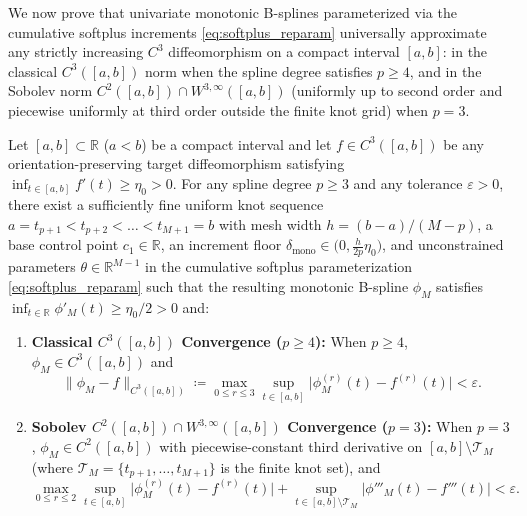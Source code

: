 We now prove that univariate monotonic B-splines parameterized via the cumulative softplus increments \eqref{eq:softplus_reparam} universally approximate any strictly increasing $C^3$ diffeomorphism on a compact interval $[a, b]$: in the classical $C^3([a, b])$ norm when the spline degree satisfies $p \ge 4$, and in the Sobolev norm $C^2([a, b]) \cap W^{3,\infty}([a, b])$ (uniformly up to second order and piecewise uniformly at third order outside the finite knot grid) when $p = 3$.

\begin{theorem}
\label{thm:univariate_c3_universality}
Let $[a, b] \subset \mathbb{R}$ ($a < b$) be a compact interval and let $f \in C^3([a, b])$ be any orientation-preserving target diffeomorphism satisfying $\inf_{t \in [a, b]} f'(t) \ge \eta_0 > 0$. For any spline degree $p \ge 3$ and any tolerance $\varepsilon > 0$, there exist a sufficiently fine uniform knot sequence $a = t_{p+1} < t_{p+2} < \dots < t_{M+1} = b$ with mesh width $h = (b - a)/(M - p)$, a base control point $c_1 \in \mathbb{R}$, an increment floor $\delta_{\text{mono}} \in \big(0, \frac{h}{2p}\eta_0\big)$, and unconstrained parameters $\theta \in \mathbb{R}^{M-1}$ in the cumulative softplus parameterization \eqref{eq:softplus_reparam} such that the resulting monotonic B-spline $\phi_M$ satisfies $\inf_{t \in \mathbb{R}} \phi'_M(t) \ge \eta_0 / 2 > 0$ and:
\begin{enumerate}
    \item \textbf{Classical $C^3([a, b])$ Convergence ($p \ge 4$):} When $p \ge 4$, $\phi_M \in C^3([a, b])$ and
    \begin{equation}
        \| \phi_M - f \|_{C^3([a, b])} \coloneqq \max_{0 \le r \le 3} \sup_{t \in [a, b]} \big| \phi_M^{(r)}(t) - f^{(r)}(t) \big| < \varepsilon.
        \label{eq:c3_norm_bound}
    \end{equation}
    \item \textbf{Sobolev $C^2([a, b]) \cap W^{3,\infty}([a, b])$ Convergence ($p = 3$):} When $p = 3$, $\phi_M \in C^2([a, b])$ with piecewise-constant third derivative on $[a, b] \setminus \mathcal{T}_M$ (where $\mathcal{T}_M = \{t_{p+1}, \dots, t_{M+1}\}$ is the finite knot set), and
    \begin{equation}
        \max_{0 \le r \le 2} \sup_{t \in [a, b]} \big| \phi_M^{(r)}(t) - f^{(r)}(t) \big| + \sup_{t \in [a, b] \setminus \mathcal{T}_M} \big| \phi'''_M(t) - f'''(t) \big| < \varepsilon.
        \label{eq:w3_norm_bound}
    \end{equation}
\end{enumerate}
\end{theorem}

